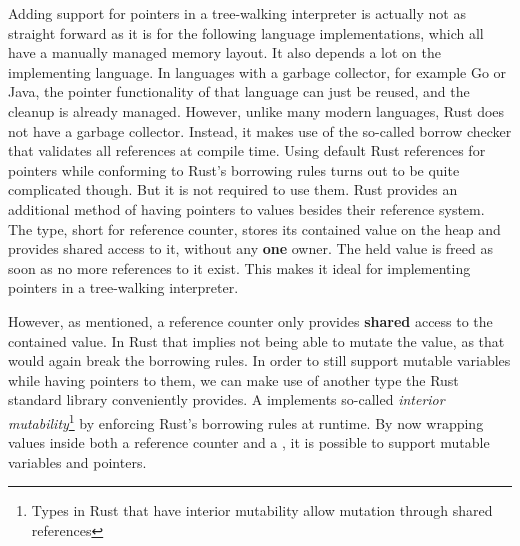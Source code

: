 Adding support for pointers in a tree-walking interpreter is actually not as straight forward as it is for the following language implementations, which all have a manually managed memory layout.
It also depends a lot on the implementing language.
In languages with a garbage collector, for example Go or Java, the pointer functionality of that language can just be reused, and the cleanup is already managed.
However, unlike many modern languages, Rust does not have a garbage collector.
Instead, it makes use of the so-called borrow checker that validates all references at compile time.
Using default Rust references for pointers while conforming to Rust's borrowing rules turns out to be quite complicated though.
But it is not required to use them.
Rust provides an additional method of having pointers to values besides their reference system.
The  type, short for reference counter, stores its contained value on the heap and provides shared access to it, without any \textbf{one} owner.
The held value is freed as soon as no more references to it exist.
This makes it ideal for implementing pointers in a tree-walking interpreter.

However, as mentioned, a reference counter only provides \textbf{shared} access to the contained value.
In Rust that implies not being able to mutate the value, as that would again break the borrowing rules.
In order to still support mutable variables while having pointers to them, we can make use of another type the Rust standard library conveniently provides.
A  implements so-called \emph{interior mutability}\footnote{Types in Rust that have interior mutability allow mutation through shared references} by enforcing Rust's borrowing rules at runtime.
By now wrapping values inside both a reference counter and a , it is possible to support mutable variables and pointers.
